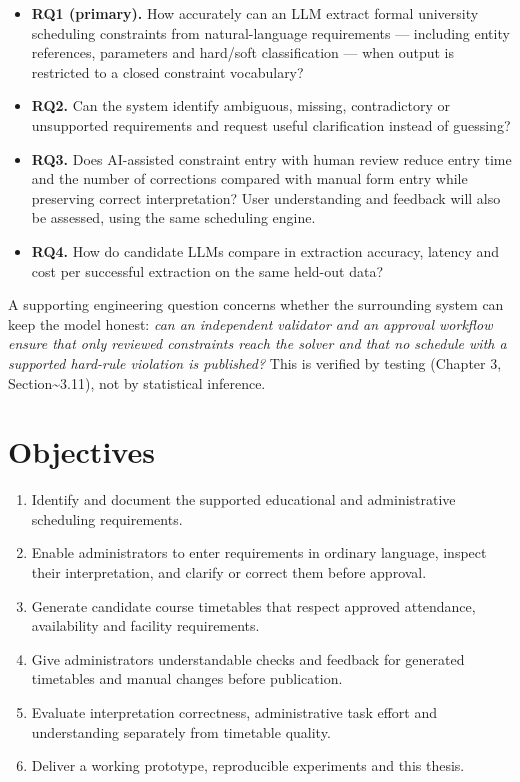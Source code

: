 \documentclass[
  11pt,a4paper,oneside]{report}
\providecommand{\tightlist}{%
  \setlength{\itemsep}{0pt}\setlength{\parskip}{0pt}}
\begin{document}
\begin{itemize}
\tightlist
\item
  \textbf{RQ1 (primary).} How accurately can an LLM extract formal
  university scheduling constraints from natural-language requirements
  --- including entity references, parameters and hard/soft
  classification --- when output is restricted to a closed constraint
  vocabulary?
\item
  \textbf{RQ2.} Can the system identify ambiguous, missing,
  contradictory or unsupported requirements and request useful
  clarification instead of guessing?
\item
  \textbf{RQ3.} Does AI-assisted constraint entry with human review
  reduce entry time and the number of corrections compared with manual
  form entry while preserving correct interpretation? User understanding and feedback will also be assessed, using the same scheduling engine.
\item
  \textbf{RQ4.} How do candidate LLMs compare in extraction accuracy,
  latency and cost per successful extraction on the same held-out data?
\end{itemize}

A supporting engineering question concerns whether the surrounding
system can keep the model honest: \emph{can an independent validator and
an approval workflow ensure that only reviewed constraints reach the
solver and that no schedule with a supported hard-rule violation is
published?} This is verified by testing (Chapter 3,
Section\textasciitilde3.11), not by statistical inference.

\hypertarget{objectives}{%
\section{Objectives}\label{objectives}}

\begin{enumerate}
\def\labelenumi{\arabic{enumi}.}
\tightlist
\item
  Identify and document the supported educational and administrative scheduling requirements.
\item
  Enable administrators to enter requirements in ordinary language, inspect their interpretation, and clarify or correct them before approval.
\item
  Generate candidate course timetables that respect approved attendance, availability and facility requirements.
\item
  Give administrators understandable checks and feedback for generated timetables and manual changes before publication.
\item
  Evaluate interpretation correctness, administrative task effort and understanding separately from timetable quality.
\item
  Deliver a working prototype, reproducible experiments and this thesis.
\end{enumerate}
\end{document}
